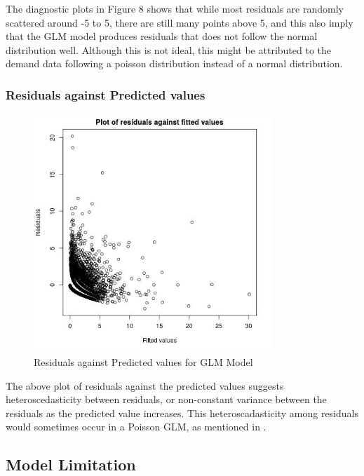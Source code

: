 \documentclass[12pt, letterpaper] {article}
\begin{document}
\noindent The diagnostic plots in Figure 8 shows that while most residuals are randomly scattered around -5 to 5, there are still many points above 5, and this also imply that the GLM model produces residuals that does not follow the normal distribution well. Although this is not ideal, this might be attributed to the demand data following a poisson distribution instead of a normal distribution. 

\subsubsection{Residuals against Predicted values}

\begin{figure}[H]
    \centering
    \includegraphics[width=0.8\textwidth, height=0.5\textheight]{Images/Full_GLM_resids_vs_fitted.jpg}
    \caption{Residuals against Predicted values for GLM Model}
    \label{fig:Residuals against Predicted values for GLM Model}
\end{figure}

\noindent The above plot of residuals against the predicted values suggests heteroscedasticity between residuals, or non-constant variance between the residuals as the predicted value increases. This heteroscadasticity among residuals would sometimes occur in a Poisson GLM, as mentioned in \cite{Dylan2017}. 

\subsection{Model Limitation}
\end{document}
